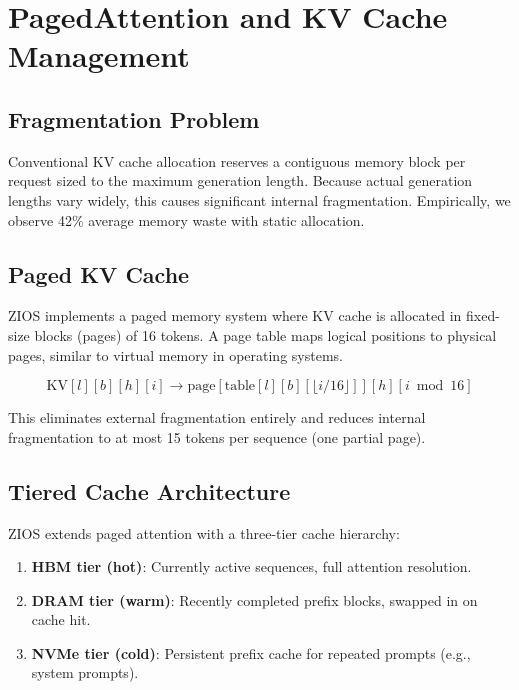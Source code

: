 \documentclass[11pt,a4paper]{article}
\begin{document}
\section{PagedAttention and KV Cache Management}

\subsection{Fragmentation Problem}

Conventional KV cache allocation reserves a contiguous memory block per request sized to the maximum generation length. Because actual generation lengths vary widely, this causes significant internal fragmentation. Empirically, we observe 42\% average memory waste with static allocation.

\subsection{Paged KV Cache}

ZIOS implements a paged memory system where KV cache is allocated in fixed-size blocks (pages) of 16 tokens. A page table maps logical positions to physical pages, similar to virtual memory in operating systems.

\begin{equation}
\text{KV}[l][b][h][i] \to \text{page}[\text{table}[l][b][\lfloor i/16 \rfloor]][h][i \bmod 16]
\end{equation}

This eliminates external fragmentation entirely and reduces internal fragmentation to at most 15 tokens per sequence (one partial page).

\subsection{Tiered Cache Architecture}

ZIOS extends paged attention with a three-tier cache hierarchy:

\begin{enumerate}
  \item \textbf{HBM tier (hot)}: Currently active sequences, full attention resolution.
  \item \textbf{DRAM tier (warm)}: Recently completed prefix blocks, swapped in on cache hit.
  \item \textbf{NVMe tier (cold)}: Persistent prefix cache for repeated prompts (e.g., system prompts).
\end{enumerate}
\end{document}
